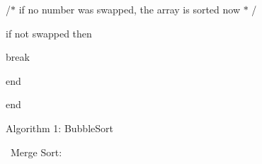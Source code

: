 \documentclass[12pt]{article}
\begin{document}
\begin{adjustwidth}{0.54in}{0.0in}
{\fontsize{11pt}{13.2pt}\selectfont /$\ast$  if no number  was swapped, the array  is sorted  now $\ast$ /\par}\par

\end{adjustwidth}

\begin{adjustwidth}{0.54in}{0.0in}
{\fontsize{11pt}{13.2pt}\selectfont if not swapped then\par}\par

\end{adjustwidth}

\begin{adjustwidth}{0.77in}{0.0in}
{\fontsize{11pt}{13.2pt}\selectfont break\par}\par

\end{adjustwidth}

\begin{adjustwidth}{0.54in}{0.0in}
{\fontsize{11pt}{13.2pt}\selectfont end\par}\par

\end{adjustwidth}

\begin{adjustwidth}{0.31in}{6.61in}
\begin{justify}
{\fontsize{11pt}{13.2pt}\selectfont end\par}
\end{justify}\par

\end{adjustwidth}

\begin{adjustwidth}{2.63in}{2.75in}
\begin{Center}
{\fontsize{11pt}{13.2pt}\selectfont Algorithm 1: BubbleSort\par}
\end{Center}\par

\end{adjustwidth}


\vspace{\baselineskip}

\vspace{\baselineskip}
\begin{adjustwidth}{0.07in}{5.72in}
\begin{justify}
{\fontsize{14pt}{16.8pt}\   Merge  Sort:\par}
\end{justify}\par

\end{adjustwidth}
\end{document}
